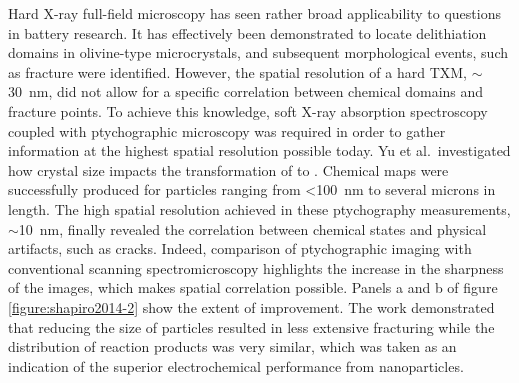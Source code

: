 \documentclass[journal=cmatex,manuscript=perspective]{achemso}
\begin{document}
Hard X-ray full-field microscopy has seen rather broad applicability
to questions in battery research. It has effectively been demonstrated
to locate delithiation domains in olivine-type 
microcrystals, and subsequent morphological events, such as fracture
were identified\cite{boesenberg2013}. However, the spatial resolution
of a hard TXM, $\sim$\SI{30}{nm}, did not allow for a specific
correlation between chemical domains and fracture points. To achieve
this knowledge, soft X-ray absorption spectroscopy coupled with
ptychographic microscopy was required in order to gather information
at the highest spatial resolution possible today. Yu et
al.\ investigated how crystal size impacts the transformation of
 to \cite{yu2015-2}. Chemical maps were
successfully produced for particles ranging from <\SI{100}{nm} to
several microns in length. The high spatial resolution achieved in
these ptychography measurements, $\sim$\SI{10}{nm}, finally revealed
the correlation between chemical states and physical artifacts, such
as cracks. Indeed, comparison of ptychographic imaging with
conventional scanning spectromicroscopy highlights the increase in the
sharpness of the images, which makes spatial correlation
possible. Panels a and b of figure \ref{figure:shapiro2014-2} show the
extent of improvement\cite{shapiro2014}. The work demonstrated that
reducing the size of  particles resulted in less extensive
fracturing while the distribution of reaction products was very
similar, which was taken as an indication of the superior
electrochemical performance from 
nanoparticles\cite{yu2015-2}.
\end{document}
